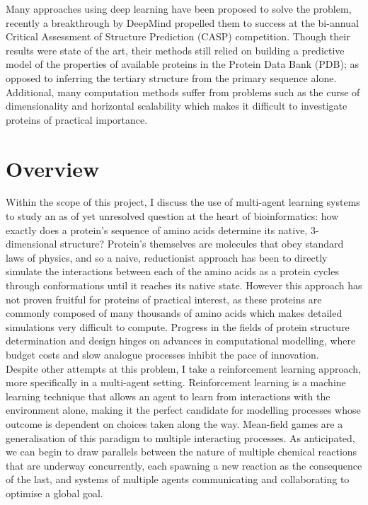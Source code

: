   Many approaches using deep learning have been proposed to solve the problem,
   recently a breakthrough by DeepMind \cite{Senior2020} propelled them to success
   at the bi-annual Critical Assessment of Structure Prediction (CASP) competition. Though their
   results were state of the art, their methods still relied on building a predictive model of the
   properties of available proteins in the Protein Data Bank (PDB); as 
   opposed to inferring the tertiary structure from the primary sequence alone.
   Additional, many computation methods suffer from problems such as the curse of
   dimensionality and horizontal scalability which makes it difficult to investigate
   proteins of practical importance.
\section{Overview}
Within the scope of this project, I discuss the use of 
multi-agent learning systems to study an as of yet unresolved question 
at the heart of bioinformatics: how exactly does a protein's sequence
of amino acids determine its native, 3-dimensional structure?
Protein's themselves are molecules that obey standard laws of physics,
and so a naive, reductionist approach has been to directly simulate 
the interactions between each of the amino acids as a protein cycles
through conformations until it reaches its native state. However this 
approach has not proven fruitful for proteins of practical interest, as 
these proteins are commonly composed of many thousands of amino acids which
makes detailed simulations very difficult to compute. Progress in the fields
of protein structure determination and design hinges on advances in 
computational modelling, where budget costs and slow analogue processes 
inhibit the pace of innovation. \\

Despite other attempts at this problem, I take a reinforcement learning approach,
more specifically in a multi-agent setting. Reinforcement learning is a machine
learning technique that allows an agent to learn from interactions with the environment
alone, making it the perfect candidate for modelling processes whose outcome is 
dependent on choices taken along the way. Mean-field games are a generalisation
of this paradigm to multiple interacting processes. As anticipated, we can begin
to draw parallels between the nature of multiple chemical reactions that are underway
concurrently, each spawning a new reaction as the consequence of the last, and systems
of multiple agents communicating and collaborating to optimise a global goal.\\

